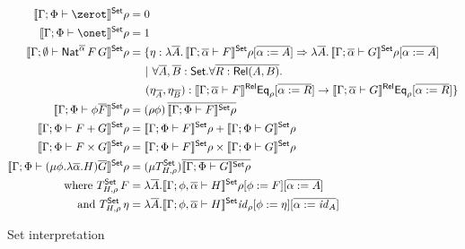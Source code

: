 \documentclass[runningheads]{llncs}
\newcommand{\set}{\mathsf{Set}}
\renewcommand{\id}{\mathit{id}}
\renewcommand{\id}{\mathit{id}}
\begin{document}
\begin{figure}[t]
  \begin{adjustbox}{varwidth=5in, max width=5in, fbox, center}
  \begin{align*}
  \setsem{\Gamma;\Phi \vdash \zerot}\rho &= 0\\
  \setsem{\Gamma;\Phi \vdash \onet}\rho &= 1\\
  \setsem{\Gamma; \emptyset
    \vdash \Nat^{\ol{\alpha}}
    \,F\,G}\rho &= \{\eta : \lambda \ol{A}. \,\setsem{\Gamma;
    \ol{\alpha} \vdash
    F}\rho[\ol{\alpha := A}] 
      \Rightarrow \lambda \ol{A}.\,\setsem{\Gamma; 
        \ol{\alpha} \vdash G}\rho[\ol{\alpha := A}] \\ 
      &\hspace{0.2in}|~\forall \overline{A}, \overline{B} :
      \set. \forall \overline{R : \rel(A, B)}.\\ 
      &\hspace{0.2in}(\eta_{\overline{A}}, \eta_{\overline{B}})
      : \relsem{\Gamma; \ol{\alpha} \vdash F}\Eq_{\rho}[\ol{\alpha := R}]
      \rightarrow \relsem{\Gamma; \ol{\alpha} \vdash
        G}\Eq_{\rho}[\ol{\alpha := R}] \} \\
  \setsem{\Gamma;\Phi \vdash \phi\ol{F}}\rho &=
  (\rho\phi)\,\ol{\setsem{\Gamma;\Phi \vdash
    F}\rho}\\
  \setsem{\Gamma;\Phi \vdash F+G}\rho &=
  \setsem{\Gamma;\Phi \vdash F}\rho +
  \setsem{\Gamma;\Phi \vdash G}\rho\\
  \setsem{\Gamma;\Phi \vdash F\times G}\rho &=
  \setsem{\Gamma;\Phi \vdash F}\rho \times
  \setsem{\Gamma;\Phi \vdash G}\rho\\ 
  \setsem{\Gamma;\Phi \vdash (\mu \phi.\lambda
    \ol{\alpha}. H)\ol{G}}\rho &= (\mu
    T^\set_{H,\rho})\ol{\setsem{\Gamma;\Phi \vdash G}\rho}\\
    \text{where } T^\set_{H,\rho}\,F & = \lambda
  \ol{A}. \setsem{\Gamma; \phi, \ol{\alpha} \vdash
    H}\rho[\phi :=  F][\ol{\alpha := A}]\\
  \text{and } T^\set_{H,\rho}\,\eta &= \lambda
  \ol{A}. \setsem{\Gamma;\phi, \ol{\alpha} \vdash
    H}\id_\rho[\phi := \eta][\ol{\alpha := \id_{A}}]
\end{align*}
\vspace*{-0.3in}\caption{Set interpretation}\label{fig:set-sem} 
\vspace*{-0.3in}
\end{adjustbox}\vspace*{-0.17in}
  \end{figure}
\end{document}
